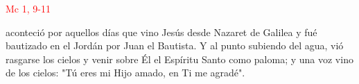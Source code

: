 \hfill\textcolor{red}{Mc 1, 9-11}

aconteció por aquellos días que vino Jesús desde Nazaret de Galilea y fué bautizado en el Jordán por Juan el Bautista.
Y al punto subiendo del agua, vió rasgarse los cielos y venir sobre Él el Espíritu Santo como paloma; y una voz vino de los cielos: 
"Tú eres mi Hijo amado, en Ti me agradé".
